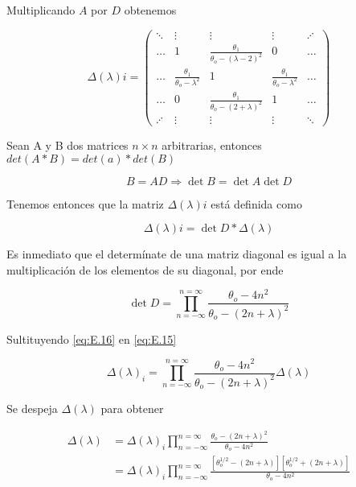 Multiplicando $A$ por $D$ obtenemos

\large
\begin{equation}\label{eq:E.13}
\Delta(\lambda){i}= 
\begin{pmatrix}
\ddots & \vdots & \vdots & \vdots & \iddots \\
\dots & 1 & \frac{\theta_1}{\theta_o-(\lambda-2)^2} & 0 & \dots \\ 
\dots  & \frac{\theta_1}{\theta_o-\lambda^2} & 1 & \frac{\theta_1}{\theta_o-\lambda^2} &\dots\\
 \dots  & 0 & \frac{\theta_1}{\theta_o- (2+\lambda)^2} & 1 & \dots\\ 
 \iddots & \vdots & \vdots & \vdots & \ddots
\end{pmatrix}
\end{equation}
\normalsize 

\begin{teo}
 Sean A y B dos matrices $n\times n$ arbitrarias, entonces $det(A*B)=det(a)*det(B)$\cite{jacob}
\end{teo}

\begin{equation}\label{eq:E.14}
B=AD \Rightarrow \det B= \det A \det D
\end{equation}

Tenemos entonces que la matriz $\Delta(\lambda){i}$ está definida como

\begin{equation}\label{eq:E.15}
\Delta(\lambda){i}=\det D *\Delta(\lambda)
\end{equation}

Es inmediato que el determínate de una matriz diagonal es igual a la multiplicación de los elementos de su diagonal, por ende 

\begin{equation}\label{eq:E.16}
   \det D= \prod_{n=-\infty}^{n=\infty} \frac{\theta_o-4n^2}{\theta_o-(2n+\lambda)^2}
\end{equation}

Sultituyendo \ref{eq:E.16} en \ref{eq:E.15}

\begin{equation}\label{eq:E.17}
\Delta(\lambda)_{i} = \prod_{n=-\infty}^{n=\infty} \frac{\theta_o-4n^2}{\theta_o-(2n+\lambda)^2} \Delta(\lambda)
\end{equation}

Se despeja $\Delta(\lambda)$ para obtener

\begin{equation}\label{eq:E.18}
\begin{aligned}
\Delta(\lambda) & =\Delta(\lambda)_{i} \prod_{n=-\infty}^{n=\infty} \frac{\theta_o-(2n+\lambda)^2}{\theta_o-4n^2} \\
& = \Delta(\lambda)_{i} \prod_{n=-\infty}^{n=\infty} \frac{[\theta_o^{1/2}-(2n+\lambda)][\theta_o^{1/2}+(2n+\lambda)]}{\theta_o-4n^2} 
\end{aligned}
\end{equation}

